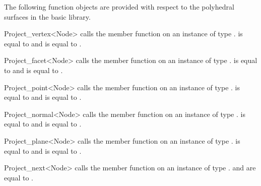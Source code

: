 The following function objects are provided with respect to the
polyhedral surfaces in the basic library.

\ccHtmlNoClassFile
\begin{ccClassTemplate}{Project_vertex<Node>}
    {calls the member function  on an instance of type 
      .  is equal to  and 
       is equal to .}
\end{ccClassTemplate}

\ccHtmlNoClassFile
\begin{ccClassTemplate}{Project_facet<Node>}
    {calls the member function  on an instance of type 
      .  is equal to  and 
       is equal to .}
\end{ccClassTemplate}

\ccHtmlNoClassFile
\begin{ccClassTemplate}{Project_point<Node>}
    {calls the member function  on an instance of type 
      .  is equal to  and 
       is equal to .}
\end{ccClassTemplate}

\ccHtmlNoClassFile
\begin{ccClassTemplate}{Project_normal<Node>}
    {calls the member function  on an instance of type 
      .  is equal to  and 
       is equal to .}
\end{ccClassTemplate}

\ccHtmlNoClassFile
\begin{ccClassTemplate}{Project_plane<Node>}
    {calls the member function  on an instance of type 
      .  is equal to  and 
       is equal to .}
\end{ccClassTemplate}

\ccHtmlNoClassFile
\begin{ccClassTemplate}{Project_next<Node>}
    {calls the member function  on an instance of type 
      .  and  are equal
      to .}
\end{ccClassTemplate}


